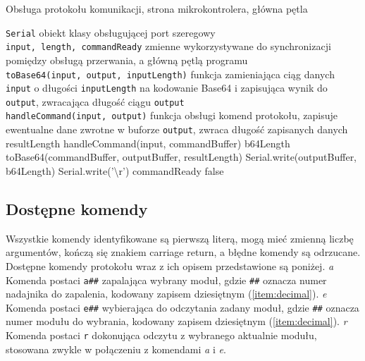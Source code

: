 \begin{algorithm}
\caption{Obsługa protokołu komunikacji, strona mikrokontrolera, główna pętla}
\label{alg:proto_uc_main}
\begin{algorithmic}[1]
  \REQUIRE \texttt{Serial} \ppauza obiekt klasy obsługującej port szeregowy\\
  \texttt{input, length, commandReady} \ppauza zmienne wykorzystywane do synchronizacji pomiędzy obsługą przerwania, a główną pętlą programu\\
  \texttt{toBase64(input, output, inputLength)} \ppauza funkcja zamieniająca ciąg danych \texttt{input} o długości \texttt{inputLength} na kodowanie Base64 i zapisująca wynik do \texttt{output}, zwracająca długość ciągu \texttt{output}\\
  \texttt{handleCommand(input, output)} \ppauza funkcja obsługi komend protokołu, zapisuje ewentualne dane zwrotne w buforze \texttt{output}, zwraca długość zapisanych danych
      \STATE resultLength \textleftarrow{} handleCommand(input, commandBuffer)
      \STATE b64Length \textleftarrow{} toBase64(commandBuffer, outputBuffer, resultLength)
      \STATE Serial.write(outputBuffer, b64Length)
      \STATE Serial.write('\textbackslash{}r')
      \STATE commandReady \textleftarrow{} false
    \ENDIF
  \ENDWHILE
\end{algorithmic}
\end{algorithm}

\subsection{Dostępne komendy}

Wszystkie komendy identyfikowane są pierwszą literą, mogą mieć zmienną liczbę argumentów, kończą się znakiem carriage return, a błędne komendy są odrzucane.
Dostępne komendy protokołu wraz z ich opisem przedstawione są poniżej.
\newline
\newline
\textsl{a}
Komenda postaci \texttt{a\#\#} zapalająca wybrany moduł, gdzie \texttt{\#\#} oznacza numer nadajnika do zapalenia, kodowany zapisem dziesiętnym (\ref{item:decimal}).
\newline
\newline
\textsl{e}
Komenda postaci \texttt{e\#\#} wybierająca do odczytania zadany moduł, gdzie \texttt{\#\#} oznacza numer modułu do wybrania, kodowany zapisem dziesiętnym (\ref{item:decimal}).
\newline
\newline
\textsl{r}
Komenda postaci \texttt{r} dokonująca odczytu z wybranego aktualnie modułu, stosowana zwykle w połączeniu z komendami \textsl{a} i \textsl{e}.

